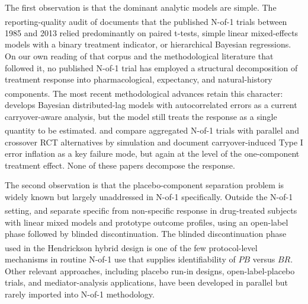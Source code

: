 \documentclass[
  11pt,
]{article}
\begin{document}
The first observation is that the dominant analytic models are simple. The
reporting-quality audit of\textsuperscript{} documents that the published N-of-1
trials between 1985 and 2013 relied predominantly on paired t-tests, simple
linear mixed-effects models with a binary treatment indicator, or hierarchical
Bayesian regressions. On our own reading of that corpus and the methodological
literature that followed it, no published N-of-1 trial has employed a
structural decomposition of treatment response into pharmacological,
expectancy, and natural-history components. The most recent methodological
advances retain this character:\textsuperscript{} develops Bayesian distributed-lag
models with autocorrelated errors as a current carryover-aware analysis, but
the model still treats the response as a single quantity to be estimated.\textsuperscript{} and\textsuperscript{} compare aggregated
N-of-1 trials with parallel and crossover RCT alternatives by simulation and
document carryover-induced Type I error inflation as a key failure mode, but
again at the level of the one-component treatment effect. None of these papers
decompose the response.

The second observation is that the placebo-component separation problem is
widely known but largely unaddressed in N-of-1 specifically. Outside the
N-of-1 setting,\textsuperscript{} and\textsuperscript{} separate specific from
non-specific response in drug-treated subjects with linear mixed models
and prototype outcome profiles, using an open-label phase followed by
blinded discontinuation. The blinded
discontinuation phase used in the Hendrickson hybrid design\textsuperscript{}
is one of the few protocol-level mechanisms in routine N-of-1 use that
supplies identifiability of \(PB\) versus \(BR\). Other relevant approaches,
including placebo run-in designs, open-label-placebo trials, and
mediator-analysis applications, have been developed in parallel but rarely
imported into N-of-1 methodology.
\end{document}
